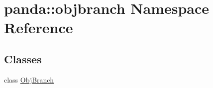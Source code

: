 \hypertarget{namespacepanda_1_1objbranch}{
\section{panda::objbranch Namespace Reference}
\label{namespacepanda_1_1objbranch}
}
\subsection*{Classes}
\begin{DoxyCompactItemize}
\item 
class \hyperlink{classpanda_1_1objbranch_1_1ObjBranch}{ObjBranch}
\end{DoxyCompactItemize}
